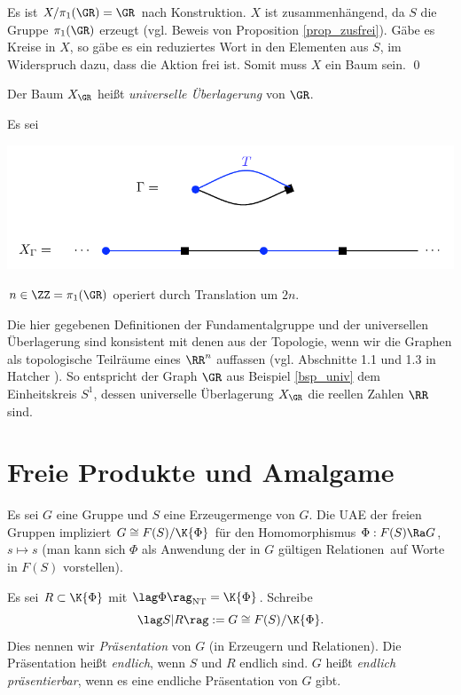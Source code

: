Es ist $X/\pi_1(\GR)=\GR$ nach Konstruktion. $X$ ist
zusammenhängend, da $S$ die Gruppe $\pi_1(\GR)$ erzeugt
(vgl. Beweis von Proposition \ref{prop_zusfrei}).
Gäbe es Kreise in $X$, so gäbe es ein reduziertes Wort in den
Elementen aus $S$, im Widerspruch dazu, dass die Aktion frei ist.
Somit muss $X$ ein Baum sein.
\qed

\DEF Der Baum $X_{\GR}$ heißt \emph{universelle Überlagerung} von $\GR$.

\BSP\label{bsp_univ} Es sei
\begin{center}
	\includegraphics{grugraImages/univ}
\end{center}
$n\in\ZZ=\pi_1(\GR)$ operiert durch Translation um $2n$.

Die hier gegebenen Definitionen der Fundamentalgruppe und der
universellen Überlagerung sind konsistent mit denen aus der
Topologie, wenn wir die Graphen als topologische Teilräume
eines $\RR^n$ auffassen
(vgl. Abschnitte 1.1 und 1.3 in Hatcher \cite{hatcher}).
So entspricht der Graph $\GR$ aus
Beispiel \ref{bsp_univ} dem Einheitskreis $S^1$, dessen
universelle Überlagerung $X_{\GR}$ die reellen Zahlen $\RR$ sind.


\section{Freie Produkte und Amalgame}\label{sec_amal}

Es sei $G$ eine Gruppe und $S$ eine Erzeugermenge von $G$.
Die UAE der freien Gruppen impliziert
$G\cong F(S)/\K{\Phi}$ für den Homomorphismus
$\Phi:F(S)\Ra G$, $s\mapsto s$ (man kann sich $\Phi$ als
\glqq Anwendung der in $G$ gültigen Relationen\grqq\ auf Worte
in $F(S)$ vorstellen).

\DEF Es sei $R\subset \K{\Phi}$ mit
$\lag\Phi\rag_{\mathrm{NT}} = \K{\Phi}$. Schreibe
\[
\lag S|R \rag := G \cong F(S)/\K{\Phi}.
\]
Dies nennen wir \emph{Präsentation} von $G$
(in Erzeugern und Relationen). Die Präsentation heißt
\emph{endlich},
wenn $S$ und $R$ endlich sind. $G$ heißt \emph{endlich präsentierbar},
wenn es eine endliche Präsentation von $G$ gibt.

